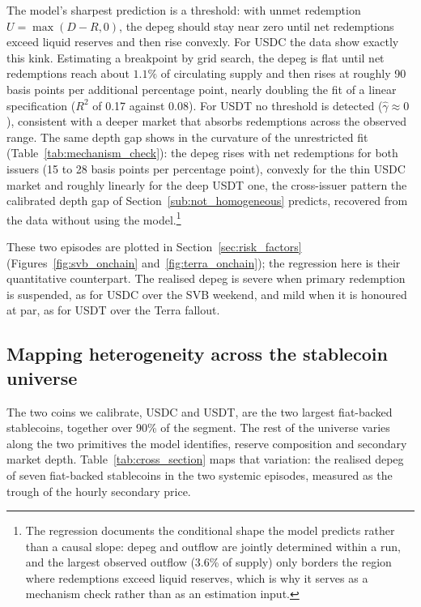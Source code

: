 The model's sharpest prediction is a threshold: with unmet redemption $U = \max(D-R,0)$, the depeg should stay near zero until net redemptions exceed liquid reserves and then rise convexly. For USDC the data show exactly this kink. Estimating a breakpoint by grid search, the depeg is flat until net redemptions reach about $1.1\%$ of circulating supply and then rises at roughly 90 basis points per additional percentage point, nearly doubling the fit of a linear specification ($R^2$ of 0.17 against 0.08). For USDT no threshold is detected ($\hat\gamma \approx 0$), consistent with a deeper market that absorbs redemptions across the observed range. The same depth gap shows in the curvature of the unrestricted fit (Table~\ref{tab:mechanism_check}): the depeg rises with net redemptions for both issuers (15 to 28 basis points per percentage point), convexly for the thin USDC market and roughly linearly for the deep USDT one, the cross-issuer pattern the calibrated depth gap of Section~\ref{sub:not_homogeneous} predicts, recovered from the data without using the model.\footnote{The regression documents the conditional shape the model predicts rather than a causal slope: depeg and outflow are jointly determined within a run, and the largest observed outflow (3.6\% of supply) only borders the region where redemptions exceed liquid reserves, which is why it serves as a mechanism check rather than as an estimation input.}

These two episodes are plotted in Section~\ref{sec:risk_factors} (Figures~\ref{fig:svb_onchain} and~\ref{fig:terra_onchain}); the regression here is their quantitative counterpart. The realised depeg is severe when primary redemption is suspended, as for USDC over the SVB weekend, and mild when it is honoured at par, as for USDT over the Terra fallout.

\subsection{Mapping heterogeneity across the stablecoin universe}\label{sub:cross_section}

The two coins we calibrate, USDC and USDT, are the two largest fiat-backed stablecoins, together over 90\% of the segment. The rest of the universe varies along the two primitives the model identifies, reserve composition and secondary market depth. Table~\ref{tab:cross_section} maps that variation: the realised depeg of seven fiat-backed stablecoins in the two systemic episodes, measured as the trough of the hourly secondary price.

